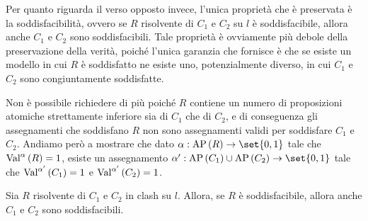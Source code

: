 Per quanto riguarda il verso opposto invece, l'unica proprietà che è preservata è la soddisfacibilità, ovvero se \(R\) risolvente di \(C_1\) e \(C_2\) su \(l\) è soddisfacibile, allora anche \(C_1\) e \(C_2\) sono soddisfacibili. Tale proprietà è ovviamente più debole della preservazione della verità, poiché l'unica garanzia che fornisce è che se esiste un modello in cui \(R\) è soddisfatto ne esiste uno, potenzialmente diverso, in cui \(C_1\) e \(C_2\) sono congiuntamente soddisfatte.

Non è possibile richiedere di più poiché \(R\) contiene un numero di proposizioni atomiche strettamente inferiore sia di \(C_1\) che di \(C_2\), e di conseguenza gli assegnamenti che soddisfano \(R\) non sono assegnamenti validi per soddisfare \(C_1\) e \(C_2\). Andiamo però a mostrare che dato \(\alpha: \AP[R] \to \set{0,1}\) tale che \(\Val{\alpha}[R] = 1\), esiste un assegnamento \(\alpha':\AP[C_1]\cup\AP[C_2] \to \set{0,1}\) tale che \(\Val{\alpha'}[C_1] = 1\) e \(\Val{\alpha'}[C_2] = 1\).

\begin{proposition}{}
  Sia \(R\) risolvente di \(C_1\) e \(C_2\) in clash su \(l\). Allora, se \(R\) è soddisfacibile, allora anche \(C_1\) e \(C_2\) sono soddisfacibili.
\end{proposition}


